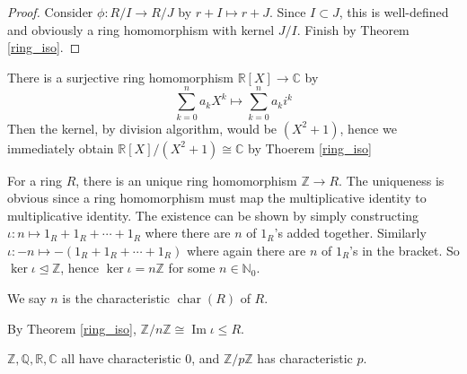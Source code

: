 \begin{proof}
    Consider $\phi:R/I\to R/J$ by $r+I\mapsto r+J$.
    Since $I\subset J$, this is well-defined and obviously a ring homomorphism with kernel $J/I$.
    Finish by Theorem \ref{ring_iso}.
\end{proof}
\begin{example}
    There is a surjective ring homomorphism $\mathbb R[X]\to\mathbb C$ by
    $$\sum_{k=0}^na_kX^k\mapsto \sum_{k=0}^na_ki^k$$
    Then the kernel, by division algorithm, would be $(X^2+1)$, hence we immediately obtain $\mathbb R[X]/(X^2+1)\cong\mathbb C$ by Thoerem \ref{ring_iso}
\end{example}
\begin{example}
    For a ring $R$, there is an unique ring homomorphism $\mathbb Z\to R$.
    The uniqueness is obvious since a ring homomorphism must map the multiplicative identity to multiplicative identity.
    The existence can be shown by simply constructing $\iota:n\mapsto 1_R+1_R+\cdots +1_R$ where there are $n$ of $1_R$'s added together.
    Similarly $\iota:-n\mapsto -(1_R+1_R+\cdots +1_R)$ where again there are $n$ of $1_R$'s in the bracket.
    So $\ker\iota\unlhd\mathbb Z$, hence $\ker\iota=n\mathbb Z$ for some $n\in\mathbb N_0$.
\end{example}
\begin{definition}
    We say $n$ is the characteristic $\operatorname{char}(R)$ of $R$.
\end{definition}
By Theorem \ref{ring_iso}, $\mathbb Z/n\mathbb Z\cong\operatorname{Im}\iota\le R$.
\begin{example}
    $\mathbb Z,\mathbb Q,\mathbb R,\mathbb C$ all have characteristic $0$, and $\mathbb Z/p\mathbb Z$ has characteristic $p$.
\end{example}